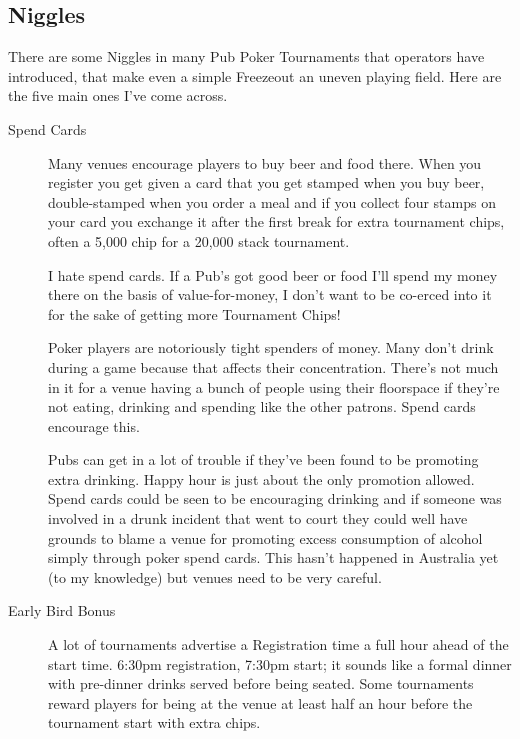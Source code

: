 
\subsection{Niggles}

There are some Niggles in many Pub Poker Tournaments that operators
have introduced, that make even a simple Freezeout an
uneven playing field. Here are the five main ones I've come across.


\begin{description}

\item[Spend Cards] Many venues encourage players to buy beer and food there.
When you register you get given a card that you get stamped when you
buy beer, double-stamped when you order a meal and if you collect four
stamps on your card you exchange it after the first break for extra
tournament chips, often a 5,000 chip for a 20,000 stack tournament.

I hate spend cards. If a Pub's got good beer or food
I'll spend my money there on the basis of value-for-money, I don't
want to be co-erced into it for the sake of getting more Tournament Chips!

Poker players are notoriously tight spenders of money.
Many don't drink during a game because that affects their concentration.
There's not much in it for a venue having a bunch of people using
their floorspace if they're not eating, drinking and spending like
the other patrons. Spend cards encourage this.

Pubs can get in a lot of trouble if they've been found to be
promoting extra drinking. Happy hour is just about the only
promotion allowed. Spend cards could be seen to be encouraging drinking
and if someone was involved in a drunk incident that went
to court they could well have grounds to blame a venue for
promoting excess consumption of alcohol simply through poker
spend cards. This hasn't happened in Australia yet (to my knowledge)
but venues need to be very careful.

\item[Early Bird Bonus] A lot of tournaments advertise a Registration
time a full hour ahead of the start time. 6:30pm registration, 7:30pm
start; it sounds like a formal dinner with pre-dinner drinks served
before being seated. Some tournaments reward players for being
at the venue at least half an hour before the tournament start with extra
chips.


\end{description}
